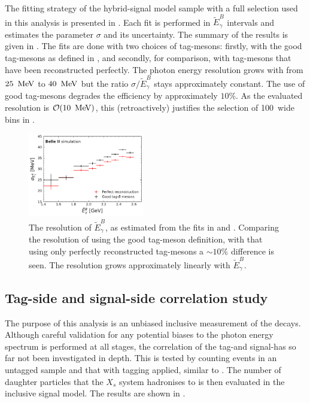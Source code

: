 The fitting strategy of the hybrid-signal model sample with a full selection used in this analysis is presented in .
Each fit is performed in $\tilde{E}_{\gamma}^{B}$ intervals and estimates the parameter $\sigma$ and its uncertainty.
The summary of the results is given in .
The fits are done with two choices of tag-\B mesons: firstly, with the good tag-\B mesons as defined in ,
and secondly, for comparison, with tag-\B mesons that have been reconstructed perfectly.
The photon energy resolution grows with \EB from $25~\mathrm{\,Me\kern -0.1em V}$ to $40~\mathrm{\,Me\kern -0.1em V}$
but the ratio $\sigma/\tilde{E}_{\gamma}^{B}$ stays approximately constant.
The use of good tag-\B mesons degrades the efficiency by approximately $10\%$.
As the evaluated resolution is ${\cal O}(10~\mathrm{\,Me\kern -0.1em V})$, this (retroactively) justifies the selection of 100~\mev wide bins in .

\begin{figure}[hbtp!]
    \centering
    \includegraphics[width=0.45\textwidth]{figures/signal_validation/resolution_bin_by_bin_withkstar.pdf}
    \caption{\label{fig:resolution_sigmas} The resolution of $\tilde{E}_{\gamma}^{B}$, 
    as estimated from the fits in  and .
    Comparing the resolution of \EB using the good tag-\B meson definition, with that using only perfectly reconstructed tag-\B mesons a $\sim10\%$ difference is seen.
    The resolution grows approximately linearly with $\tilde{E}_{\gamma}^{B}$.
    }
\end{figure}

\subsection{Tag-side and signal-side correlation study}\label{sec:inclusivity_study}

The purpose of this analysis is an unbiased inclusive measurement of the \BtoXsgamma decays.
Although careful validation for any potential biases to the photon energy spectrum is performed at all stages,
the correlation of the tag-\B and signal-\B has so far not been investigated in depth.
This is tested by counting \BtoXsgamma events in an untagged sample and that with \FEI tagging applied, similar to .
The number of daughter particles that the $X_s$ system hadronises to is then evaluated in the inclusive \BtoXsgamma signal model.
The results are shown in .

